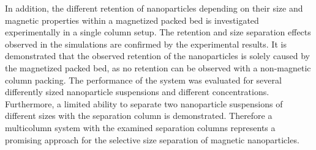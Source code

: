 In addition, the different retention of nanoparticles depending on their size and magnetic properties within a magnetized packed bed is investigated experimentally in a single column setup. The retention and size separation effects observed in the simulations are confirmed by the experimental results. It is demonstrated that the observed retention of the nanoparticles is solely caused by the magnetized packed bed, as no retention can be observed with a non-magnetic column packing. The performance of the system was evaluated for several differently sized nanoparticle suspensions and different concentrations. Furthermore, a limited ability to separate two nanoparticle suspensions of different sizes with the separation column is demonstrated. Therefore a multicolumn system with the examined separation columns represents a promising approach for the selective size separation of magnetic nanoparticles.


